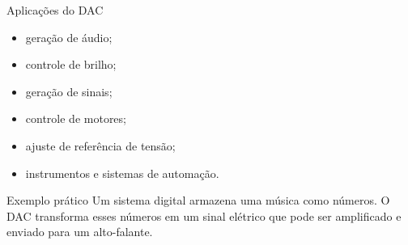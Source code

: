 \begin{frame}{Aplicações do DAC}
    \begin{itemize}
        \item geração de áudio;
        \item controle de brilho;
        \item geração de sinais;
        \item controle de motores;
        \item ajuste de referência de tensão;
        \item instrumentos e sistemas de automação.
    \end{itemize}

    \begin{exampleblock}{Exemplo prático}
        Um sistema digital armazena uma música como números. O DAC transforma
        esses números em um sinal elétrico que pode ser amplificado e enviado
        para um alto-falante.
    \end{exampleblock}
\end{frame}